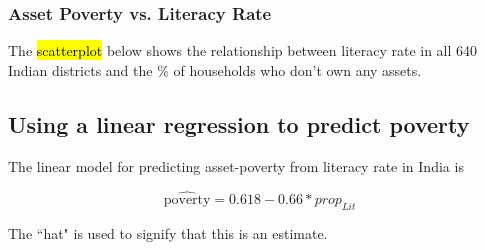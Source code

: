 \documentclass[notes,11pt, aspectratio=169]{beamer}
\begin{document}
\begin{frame}
\frametitle{Asset Poverty vs. Literacy Rate}

The \hl{scatterplot} below shows the relationship between literacy rate in all 640 Indian districts and the \% of households who don't own any assets.

{
\pause
{}
\pause
{}
\pause
{}
\pause
{}
\pause
{}
}

\end{frame}


\subsection{Using a linear regression to predict poverty}


\begin{frame}

The linear model for predicting asset-poverty from literacy rate in India is

\[ \hat{\text{poverty}} = 0.618 - 0.66 * prop_{Lit} \]

The ``hat" is used to signify that this is an estimate.

\end{frame}
\end{document}
